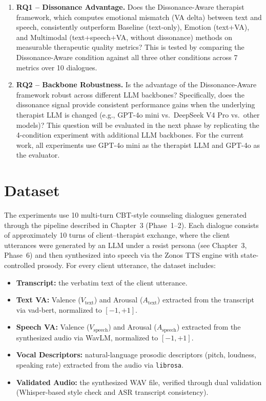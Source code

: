 \begin{enumerate}
    \item \textbf{RQ1 -- Dissonance Advantage.} Does the Dissonance-Aware therapist framework, which computes emotional mismatch (VA delta) between text and speech, consistently outperform Baseline (text-only), Emotion (text+VA), and Multimodal (text+speech+VA, without dissonance) methods on measurable therapeutic quality metrics? This is tested by comparing the Dissonance-Aware condition against all three other conditions across 7 metrics over 10 dialogues.
    
    \item \textbf{RQ2 -- Backbone Robustness.} Is the advantage of the Dissonance-Aware framework robust across different LLM backbones? Specifically, does the dissonance signal provide consistent performance gains when the underlying therapist LLM is changed (e.g., GPT-4o mini vs.\ DeepSeek V4 Pro vs.\ other models)? This question will be evaluated in the next phase by replicating the 4-condition experiment with additional LLM backbones. For the current work, all experiments use GPT-4o mini as the therapist LLM and GPT-4o as the evaluator.
\end{enumerate}

\section{Dataset}

The experiments use 10 multi-turn CBT-style counseling dialogues generated through the pipeline described in Chapter~3 (Phase~1--2). Each dialogue consists of approximately 10 turns of client--therapist exchange, where the client utterances were generated by an LLM under a resist persona (see Chapter~3, Phase~6) and then synthesized into speech via the Zonos TTS engine with state-controlled prosody. For every client utterance, the dataset includes:

\begin{itemize}
    \item \textbf{Transcript:} the verbatim text of the client utterance.
    \item \textbf{Text VA:} Valence ($V_{\text{text}}$) and Arousal ($A_{\text{text}}$) extracted from the transcript via vad-bert, normalized to $[-1, +1]$.
    \item \textbf{Speech VA:} Valence ($V_{\text{speech}}$) and Arousal ($A_{\text{speech}}$) extracted from the synthesized audio via WavLM, normalized to $[-1, +1]$.
    \item \textbf{Vocal Descriptors:} natural-language prosodic descriptors (pitch, loudness, speaking rate) extracted from the audio via \texttt{librosa}.
    \item \textbf{Validated Audio:} the synthesized WAV file, verified through dual validation (Whisper-based style check and ASR transcript consistency).
\end{itemize}

